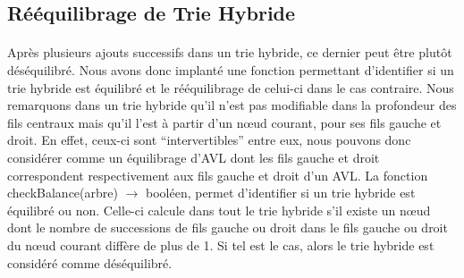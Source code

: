 \documentclass[a4paper,12pt]{report}
\begin{document}
\subsection{Rééquilibrage de Trie Hybride}
\paragraph{}
Après plusieurs ajouts successifs dans un trie hybride, ce dernier peut être plutôt déséquilibré. Nous avons donc implanté
une fonction permettant d'identifier si un trie hybride est équilibré et le rééquilibrage de celui-ci dans le cas contraire.
Nous remarquons dans un trie hybride qu'il n'est pas modifiable dans la profondeur des fils centraux mais qu'il l'est à
partir d'un nœud courant, pour ses fils gauche et droit. En effet, ceux-ci sont ``intervertibles'' entre eux, nous pouvons donc
considérer comme un équilibrage d'AVL dont les fils gauche et droit correspondent respectivement aux fils gauche et droit d'un AVL.
La fonction checkBalance(arbre) $\rightarrow$ booléen, permet d'identifier si un trie hybride est équilibré ou non. Celle-ci
calcule dans tout le trie hybride s'il existe un nœud dont le nombre de successions de fils gauche ou droit dans le fils gauche ou 
droit du nœud courant diffère de plus de 1. Si tel est le cas, alors le trie hybride est considéré comme déséquilibré.
\end{document}
